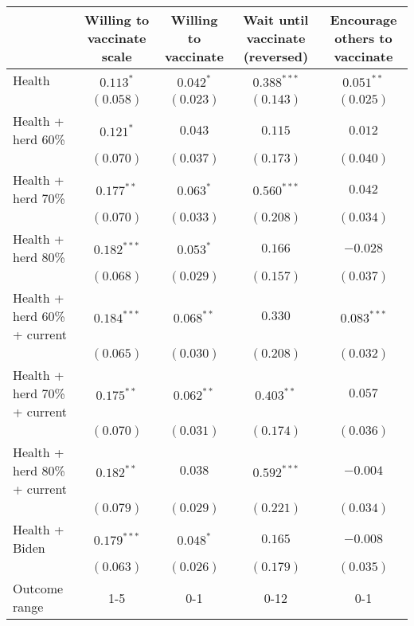 \begin{table}
\begin{center}
\begin{tabular}{l c c c c}
\hline
 & Willing to vaccinate scale & Willing to vaccinate & Wait until vaccinate (reversed) & Encourage others to vaccinate \\
\hline
Health                       & $0.113^{*}$   & $0.042^{*}$  & $0.388^{***}$ & $0.051^{**}$  \\
                             & $(0.058)$     & $(0.023)$    & $(0.143)$     & $(0.025)$     \\
Health + herd 60\%           & $0.121^{*}$   & $0.043$      & $0.115$       & $0.012$       \\
                             & $(0.070)$     & $(0.037)$    & $(0.173)$     & $(0.040)$     \\
Health + herd 70\%           & $0.177^{**}$  & $0.063^{*}$  & $0.560^{***}$ & $0.042$       \\
                             & $(0.070)$     & $(0.033)$    & $(0.208)$     & $(0.034)$     \\
Health + herd 80\%           & $0.182^{***}$ & $0.053^{*}$  & $0.166$       & $-0.028$      \\
                             & $(0.068)$     & $(0.029)$    & $(0.157)$     & $(0.037)$     \\
Health + herd 60\% + current & $0.184^{***}$ & $0.068^{**}$ & $0.330$       & $0.083^{***}$ \\
                             & $(0.065)$     & $(0.030)$    & $(0.208)$     & $(0.032)$     \\
Health + herd 70\% + current & $0.175^{**}$  & $0.062^{**}$ & $0.403^{**}$  & $0.057$       \\
                             & $(0.070)$     & $(0.031)$    & $(0.174)$     & $(0.036)$     \\
Health + herd 80\% + current & $0.182^{**}$  & $0.038$      & $0.592^{***}$ & $-0.004$      \\
                             & $(0.079)$     & $(0.029)$    & $(0.221)$     & $(0.034)$     \\
Health + Biden               & $0.179^{***}$ & $0.048^{*}$  & $0.165$       & $-0.008$      \\
                             & $(0.063)$     & $(0.026)$    & $(0.179)$     & $(0.035)$     \\
\hline
Outcome range                & 1-5           & 0-1          & 0-12          & 0-1           \\

\end{tabular}
\end{center}
\end{table}
